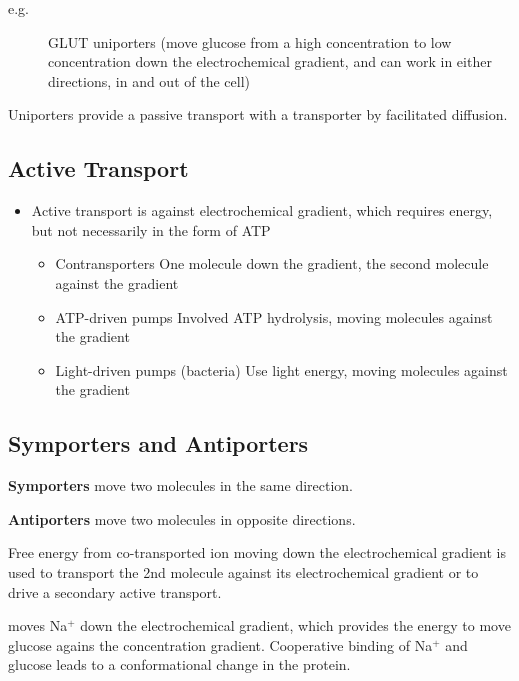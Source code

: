 \documentclass[11pt]{scrartcl}
\begin{document}
\begin{description}

\item[e.g.] GLUT uniporters (move glucose from a high concentration to low concentration down the electrochemical gradient, and can work in either directions, in and out of the cell)

\end{description}

Uniporters provide a passive transport with a transporter by facilitated diffusion.

\subsection{Active Transport}

\begin{itemize}
\item Active transport is against electrochemical gradient, which requires energy, but not necessarily in the form of ATP
\begin{itemize}
\item Contransporters
  One molecule down the gradient, the second molecule against the gradient
\item ATP-driven pumps
  Involved ATP hydrolysis, moving molecules against the gradient
\item Light-driven pumps (bacteria)
  Use light energy, moving molecules against the gradient
\end{itemize}
\end{itemize}

\subsection{Symporters and Antiporters}

\textbf{Symporters} move two molecules in the same direction.

\textbf{Antiporters} move two molecules in opposite directions.

Free energy from co-transported ion moving down the electrochemical
gradient is used to transport the 2nd molecule against its
electrochemical gradient or to drive a secondary active transport.

\begin{example}

   moves Na$^+$ down the electrochemical
  gradient, which provides the energy to move glucose agains the
  concentration gradient. Cooperative binding of Na$^{+}$ and glucose
  leads to a conformational change in the protein.

\end{example}
\end{document}
